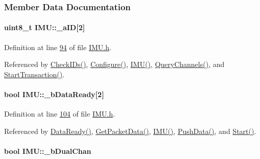 \subsubsection{Member Data Documentation}
\hypertarget{class_i_m_u_a10141bdc27465c95de6c8285d1542d78}{
\paragraph[{\_\-aID}]{\setlength{\rightskip}{0pt plus 5cm}uint8\_\-t {\bf IMU::\_\-aID}\mbox{[}2\mbox{]}}\hfill}
\label{class_i_m_u_a10141bdc27465c95de6c8285d1542d78}


Definition at line \hyperlink{_i_m_u_8h_source_l00094}{94} of file \hyperlink{_i_m_u_8h_source}{IMU.h}.



Referenced by \hyperlink{_i_m_u_8cpp_source_l00651}{CheckIDs()}, \hyperlink{_i_m_u_8cpp_source_l00803}{Configure()}, \hyperlink{_i_m_u_8cpp_source_l00020}{IMU()}, \hyperlink{_i_m_u_8cpp_source_l00120}{QueryChannels()}, and \hyperlink{_i_m_u_8cpp_source_l00323}{StartTransaction()}.

\hypertarget{class_i_m_u_a8a71f0728b2d849d1d8e54fcb58aad4e}{
\paragraph[{\_\-bDataReady}]{\setlength{\rightskip}{0pt plus 5cm}bool {\bf IMU::\_\-bDataReady}\mbox{[}2\mbox{]}}\hfill}
\label{class_i_m_u_a8a71f0728b2d849d1d8e54fcb58aad4e}


Definition at line \hyperlink{_i_m_u_8h_source_l00104}{104} of file \hyperlink{_i_m_u_8h_source}{IMU.h}.



Referenced by \hyperlink{_i_m_u_8cpp_source_l00564}{DataReady()}, \hyperlink{_i_m_u_8cpp_source_l00603}{GetPacketData()}, \hyperlink{_i_m_u_8cpp_source_l00020}{IMU()}, \hyperlink{_i_m_u_8cpp_source_l00594}{PushData()}, and \hyperlink{_i_m_u_8cpp_source_l00239}{Start()}.

\hypertarget{class_i_m_u_a62978e791838c3b4829e1d3d683e99b2}{
\paragraph[{\_\-bDualChan}]{\setlength{\rightskip}{0pt plus 5cm}bool {\bf IMU::\_\-bDualChan}}\hfill}
\label{class_i_m_u_a62978e791838c3b4829e1d3d683e99b2}


